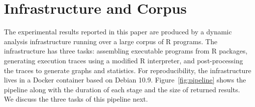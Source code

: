\documentclass[10pt,sigplan,authorversion=true]{acmart}
\begin{document}
\section{Infrastructure and Corpus}

The experimental results reported in this paper are produced by a dynamic
analysis infrastructure running over a large corpus of R programs. The
infrastructure has three tasks: assembling executable programs from R packages,
generating execution traces using a modified R interpreter, and post-processing
the traces to generate graphs and statistics. For reproducibility, the
infrastructure lives in a Docker container based on Debian 10.9.
Figure~\ref{fig:pipeline} shows the pipeline along with the duration of
each stage and the size of returned results. We discuss the three tasks of this
pipeline next.
\end{document}
